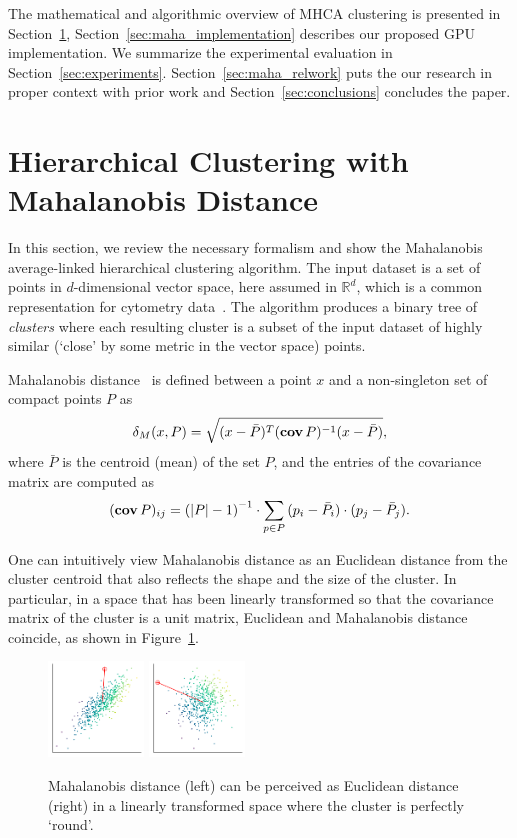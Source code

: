The mathematical and algorithmic overview of MHCA clustering is presented in Section~\ref{sec:mhca}, Section~\ref{sec:maha_implementation} describes our proposed GPU implementation. We summarize the experimental evaluation in Section~\ref{sec:experiments}. Section~\ref{sec:maha_relwork} puts the our research in proper context with prior work and Section~\ref{sec:conclusions} concludes the paper.


\section{Hierarchical Clustering with Mahalanobis Distance}\label{sec:mhca}
\label{sec:maha}

In this section, we review the necessary formalism and show the Mahalanobis average-linked hierarchical clustering algorithm.
The input dataset is a set of points in $d$-dimensional vector space, here assumed in $\mathbb{R}^d$, which is a common representation for cytometry data~\cite{shapiro2005practical}.
The algorithm produces a binary tree of \emph{clusters} where each resulting cluster is a subset of the input dataset of highly similar (`close' by some metric in the vector space) points.

Mahalanobis distance~\cite{mahalanobis1936generalized} is defined between a point $x$ and a non-singleton set of compact points $P$ as
\[ \delta_M(x,P) = \sqrt{(x-\bar{P})^T(\operatorname{\textbf{cov}} P)^{-1}(x-\bar{P})}, \]
where $\bar{P}$ is the centroid (mean) of the set $P$, and the entries of the covariance matrix are computed as
\[ (\operatorname{\textbf{cov}} P)_{ij} = \left(|P|-1\right)^{-1}\cdot \sum_{p \in P}{(p_i - \bar{P}_i)\cdot(p_j - \bar{P}_j)}. \]

One can intuitively view Mahalanobis distance as an Euclidean distance from the cluster centroid that also reflects the shape and the size of the cluster.
In particular, in a space that has been linearly transformed so that the covariance matrix of the cluster is a unit matrix, Euclidean and Mahalanobis distance coincide, as shown in Figure~\ref{fig:maha}.

\begin{figure}[t]
\centering
\includegraphics[width=1in]{Mahalanobis/img/maha1.pdf}\quad%
\includegraphics[width=1in]{Mahalanobis/img/maha2.pdf}
\caption{Mahalanobis distance (left) can be perceived as Euclidean distance (right) in a linearly transformed space where the cluster is perfectly `round'.
}
\label{fig:maha}
\end{figure}

